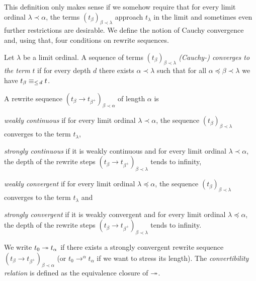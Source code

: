 This definition only makes sense if we somehow require that for every limit
ordinal $\lambda \prec \alpha$, the terms $(t_\beta)_{\beta \prec
  \lambda}$ approach $t_\lambda$ in the limit and sometimes even
further restrictions are desirable. We define the notion of Cauchy
convergence and, using that, four conditions on rewrite sequences.

\begin{definition}\label{def:cauchy}%
  Let $\lambda$ be a limit ordinal. A sequence of terms
  $(t_\beta)_{\beta \prec \lambda}$ \emph{(Cauchy-) converges to the
    term} $t$ if for every depth $d$ there exists $\alpha \prec
  \lambda$ such that for all $\alpha \preceq \beta \prec \lambda$ we
  have $t_\beta \equiv_{\le \, d} t$.
\end{definition}

\begin{definition}\label{def:convergence}%
A rewrite sequence $(t_\beta \rightarrow t_{\beta^+})_{\beta \prec
  \alpha}$ of length $\alpha$ is
\begin{compactenum}
  \item
    \emph{weakly continuous} if for every limit ordinal $\lambda \prec
    \alpha$, the sequence $(t_\beta)_{\beta \prec \lambda}$ converges
    to the term $t_\lambda$,
  \item
    \emph{strongly continuous} if it is weakly continuous and for every limit
    ordinal $\lambda \prec \alpha$, the depth of the rewrite steps $(t_\beta
    \rightarrow t_{\beta^+})_{\beta \prec \lambda}$ tends to infinity,
  \item
    \emph{weakly convergent} if for every limit ordinal $\lambda
    \preceq \alpha$, the sequence $(t_\beta)_{\beta \prec \lambda}$
    converges to the term $t_\lambda$ and
  \item
    \emph{strongly convergent} if it is weakly convergent and for
    every limit ordinal $\lambda \preceq \alpha$, the depth of the
    rewrite steps $(t_\beta \rightarrow t_{\beta^+})_{\beta \prec
      \lambda}$ tends to infinity.
\end{compactenum}
\end{definition}

We write $t_0 \twoheadrightarrow t_\alpha$ if there exists a strongly
convergent rewrite sequence $(t_\beta \rightarrow t_{\beta^+})_{\beta
  \prec \alpha}$ (or $t_0 \rightarrow^\alpha t_\alpha$ if we want to
stress its length). The \emph{convertibility relation} is defined as
the equivalence closure of $\twoheadrightarrow$.


